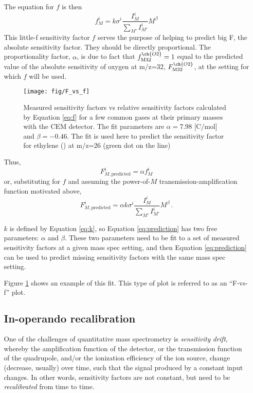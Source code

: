 \documentclass{article}
\begin{document}
The equation for $f$ is then
\begin{equation}
f^i_M = k\sigma^i\frac{I_M^i}{\sum_{M'}I^i_{M'}}M^\beta \label{eq:f}
\end{equation}
This little-f sensitivity factor $f$ serves the purpose of helping to predict big F, the absolute sensitivity factor. They should be directly proportional. The proportionality factor, $\alpha$, is due to fact that $f_\text{M32}^{\ch{O2}}=1$ equal to the predicted value of the absolute sensitivity of oxygen at m/z=32, $F_\text{M32}^{\ch{O2}}$, at the setting for which $f$ will be used.

\begin{figure}
	\centering
	\texttt{[image: fig/F\_vs\_f]}
	\caption{Measured sensitivity factors vs relative sensitivity factors calculated by Equation \ref{eq:f} for a few common gases at their primary masses with the CEM detector. The fit parameters are $\alpha=7.98$ [C/mol] and $\beta=-0.46$. The fit is used here to predict the sensitivity factor for ethylene () at m/z=26 (green dot on the line)}
	\label{fig:Fvf}
\end{figure}

Thus, 
\begin{equation}
F^i_{M, \text{predicted}} = \alpha f^i_M
\end{equation}
or, substituting for $f$ and assuming the power-of-$M$ transmission-amplification function motivated above,
\begin{equation}
F^i_{M, \text{predicted}} = \alpha k \sigma^i\frac{I_M^i}{\sum_{M'}I^i_{M'}}M^{\beta}\,. \label{eq:prediction}
\end{equation}

$k$ is defined by Equation \ref{eq:k}, so Equation \ref{eq:prediction} has two free parameters: $\alpha$ and $\beta$. These two parameters need to be fit to a set of measured sensitivity factors at a given mass spec setting, and then Equation \ref{eq:prediction} can be used to predict missing sensitivity factors with the same mass spec setting.

Figure \ref{fig:Fvf} shows an example of this fit. This type of plot is referred to as an ``F-vs-f'' plot.

\subsection{In-operando recalibration} \label{sec:recalibration}
One of the challenges of quantitative mass spectrometry is \textit{sensitivity drift}, whereby the amplification function of the detector, or the transmission function of the quadrupole, and/or the ionization efficiency of the ion source, change (decrease, usually) over time, such that the signal produced by a constant input changes. In other words, sensitivity factors are not constant, but need to be \textit{recalibrated} from time to time.
\end{document}

